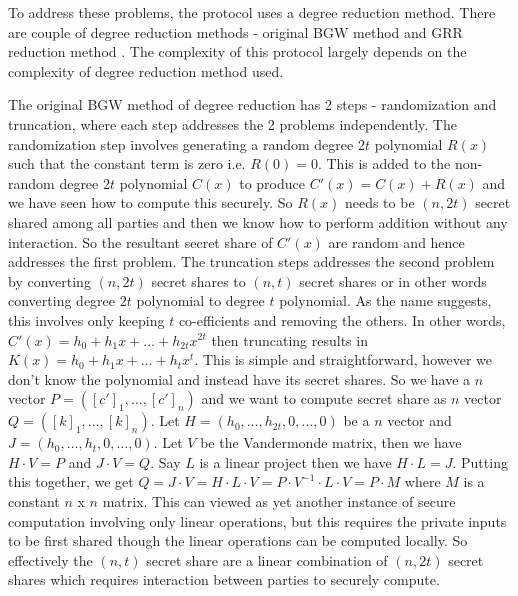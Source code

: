 \documentclass[11pt]{article}
\begin{document}
To address these problems, the protocol uses a degree reduction method. There are couple of degree reduction methods - original BGW method \cite{21, 22} and GRR reduction method \cite{20}. The complexity of this protocol largely depends on the complexity of degree reduction method used.

The original BGW method of degree reduction has 2 steps - randomization and truncation, where each step addresses the 2 problems independently. The randomization step involves generating a random degree $2t$ polynomial $R(x)$ such that the constant term is zero i.e. $R(0) = 0$. This is added to the non-random degree $2t$ polynomial $C(x)$ to produce $C'(x) = C(x) + R(x)$ and we have seen how to compute this securely. So $R(x)$ needs to be $(n, 2t)$ secret shared among all parties and then we know how to perform addition without any interaction. So the resultant secret share of $C'(x)$ are random and hence addresses the first problem. The truncation steps addresses the second problem by converting $(n, 2t)$ secret shares to $(n, t)$ secret shares or in other words converting degree $2t$ polynomial to degree $t$ polynomial. As the name suggests, this involves only keeping $t$ co-efficients and removing the others. In other words, $C'(x) = h_0 + h_1x + \dots + h_{2t}x^{2t}$ then truncating results in $K(x) = h_0 + h_1x + \dots + h_tx^t$. This is simple and straightforward, however we don't know the polynomial and instead have its secret shares. So we have a $n$ vector $P = ([c']_1, \dots, [c']_n)$ and we want to compute secret share as $n$ vector $Q = ([k]_1, \dots, [k]_n)$. Let $H = (h_0, \dots, h_{2t}, 0, \dots, 0)$ be a $n$ vector and $J = (h_0, \dots, h_{t}, 0, \dots, 0)$. Let $V$ be the Vandermonde matrix, then we have $H \cdot V = P$ and $J \cdot V = Q$. Say $L$ is a linear project then we have $H \cdot L = J$. Putting this together, we get $Q = J \cdot V = H \cdot L \cdot V = P \cdot V^{-1} \cdot L \cdot V = P \cdot M$ where $M$ is a constant $n$ x $n$ matrix. This can viewed as yet another instance of secure computation involving only linear operations, but this requires the private inputs to be first shared though the linear operations can be computed locally. So effectively the $(n, t)$ secret share are a linear combination of $(n, 2t)$ secret shares which requires interaction between parties to securely compute.
\end{document}
